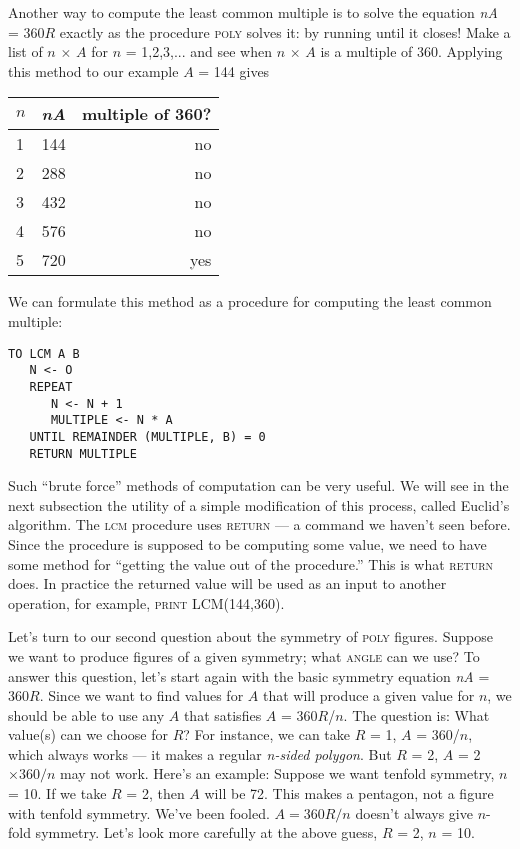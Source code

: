 \documentclass{book}
\begin{document}
Another way to compute the least common multiple is to solve the
equation {\em nA} = 360$R$ exactly as the procedure \textsc{poly} solves it: by running until it closes! Make a list of $n$ $\times$ $A$ for $n$ = 1,2,3,... and see
when $n$ $\times$ $A$ is a multiple of 360. Applying this method to our example
$A$ = 144 gives

\begin{tabular}{l c r} 
$n$ & {\em nA} & multiple of 360? \\
\hline
1 & 144 & no \\
2 & 288 & no \\
3 & 432 & no \\
4 & 576 & no \\
5 & 720 & yes \\
\end{tabular}

We can formulate this method as a procedure for computing the least
common multiple:

\begin{verbatim}
TO LCM A B
   N <- O
   REPEAT
      N <- N + 1
      MULTIPLE <- N * A
   UNTIL REMAINDER (MULTIPLE, B) = 0
   RETURN MULTIPLE
\end{verbatim}
Such ``brute force'' methods of computation can be very useful. We will
see in the next subsection the utility of a simple modification of this
process, called Euclid's algorithm. The \textsc{lcm} procedure uses \textsc{return} --- a
command we haven't seen before. Since the procedure is supposed to
be computing some value, we need to have some method for ``getting
the value out of the procedure.'' This is what \textsc{return} does. In practice
the returned value will be used as an input to another operation, for
example, \textsc{print LCM(144,360)}.

Let's turn to our second question about the symmetry of \textsc{poly} figures.
Suppose we want to produce figures of a given symmetry; what \textsc{angle}
can we use? To answer this question, let's start again with the basic
symmetry equation {\em nA} = 360$R$. Since we want to find values for $A$ that
will produce a given value for $n$, we should be able to use any $A$ that
satisfies $A$ = 360$R$/$n$. The question is: What value(s) can we choose
for $R$? For instance, we can take $R$ = 1, $A$ = 360/$n$, which always
works --- it makes a regular {\em n-sided polygon}. But $R$ = 2, $A$ = 2 $\times 360 / n$
may not work. Here's an example: Suppose we want tenfold symmetry,
$n$ = 10. If we take $R$ = 2, then $A$ will be 72. This makes a pentagon,
not a figure with tenfold symmetry.
We've been fooled. $A = 360R/n$ doesn't always give $n$-fold symmetry.
Let's look more carefully at the above guess, $R$ = 2, $n$ = 10.
\end{document}

